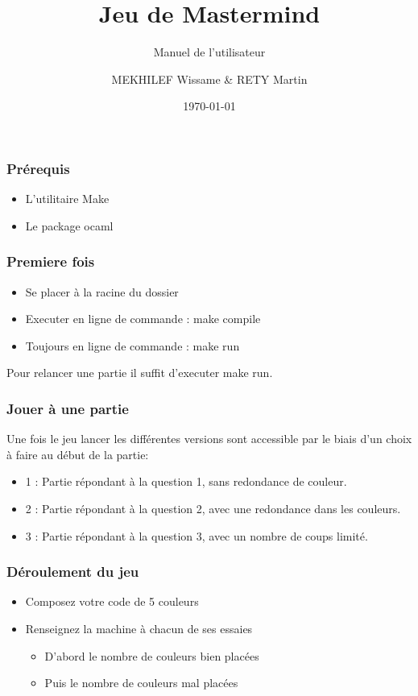 \documentclass{beamer}
\title{Jeu de Mastermind}
\subtitle{Manuel de l'utilisateur}
\author{MEKHILEF Wissame \& RETY Martin}
\institute{Université d'Orléans}
\date{\today}
\begin{document}
  \begin{frame}
   \titlepage
  \end{frame}

  \begin{frame}
   \frametitle{Prérequis}
   \begin{itemize}
    \item L'utilitaire Make
    \item Le package ocaml
   \end{itemize}
   \end{frame}
   
  \begin{frame}
    \frametitle{Premiere fois}
    \begin{itemize}
     \item Se placer à la racine du dossier
     \item Executer en ligne de commande  : make compile
     \item Toujours en ligne de commande  : make run
    \end{itemize}
    Pour relancer une partie il suffit d'executer make run.
  \end{frame}

  \begin{frame}
   \frametitle{Jouer à une partie}
   Une fois le jeu lancer les différentes versions sont accessible par le biais d'un choix à faire au début de la partie:
   \begin{itemize}
    \item 1 : Partie répondant à la question 1, sans redondance de couleur.
    \item 2 : Partie répondant à la question 2, avec une redondance dans les couleurs.
    \item 3 : Partie répondant à la question 3, avec un nombre de coups limité.
   \end{itemize}
  \end{frame}
  
  \begin{frame}
   \frametitle{Déroulement du jeu}
   \begin{itemize}
    \item Composez votre code de 5 couleurs
    \item Renseignez la machine à chacun de ses essaies
    \begin{itemize}
     \item D'abord le nombre de couleurs bien placées
     \item Puis le nombre de couleurs mal placées
    \end{itemize}
   \end{itemize}
  \end{frame}
\end{document}

